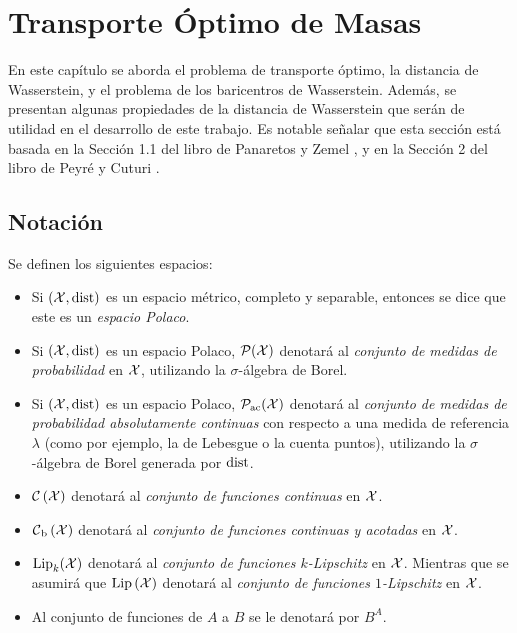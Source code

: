\chapter{Transporte Óptimo de Masas}\label{chap:transporte-optimo-de-masas}  %

En este capítulo se aborda el problema de transporte óptimo, la distancia de Wasserstein, y el problema de los baricentros de Wasserstein. Además, se presentan algunas propiedades de la distancia de Wasserstein que serán de utilidad en el desarrollo de este trabajo.
Es notable señalar que esta sección está basada en la Sección 1.1 del libro de Panaretos y Zemel \cite{panaretos2020invitation}, y en la Sección 2 del libro de Peyré y Cuturi \cite{peyre2019computational}.

\section*{Notación}\label{sec:notacion}  %

\begin{definition}
    Se definen los siguientes espacios:
    \begin{itemize}
        \item Si $(\cX, \dist)$ es un espacio métrico, completo y separable, entonces se dice que este es un \emph{espacio Polaco}.
        \item Si $(\cX, \dist)$ es un espacio Polaco, $\ProbSpace[\cX]$ denotará al \emph{conjunto de medidas de probabilidad} en $\cX$, utilizando la $\sigma$-álgebra de Borel.
        \item Si $(\cX, \dist)$ es un espacio Polaco, $\ProbSpaceAC[\cX]$ denotará al \emph{conjunto de medidas de probabilidad absolutamente continuas} con respecto a una medida de referencia $\lambda$ (como por ejemplo, la de Lebesgue o la cuenta puntos), utilizando la $\sigma$-álgebra de Borel generada por $\dist$.
        \item $\ContSpace[\cX]$ denotará al \emph{conjunto de funciones continuas} en $\cX$.
        \item $\ContBoundedSpace[\cX]$ denotará al \emph{conjunto de funciones continuas y acotadas} en $\cX$.
        \item ${\Lip}_{k}(\cX)$ denotará al \emph{conjunto de funciones $k$-Lipschitz} en $\cX$. Mientras que se asumirá que $\Lip[\cX]$ denotará al \emph{conjunto de funciones $1$-Lipschitz} en $\cX$. 
        \item Al conjunto de funciones de $A$ a $B$ se le denotará por $B^A$.
    \end{itemize}
\end{definition}

